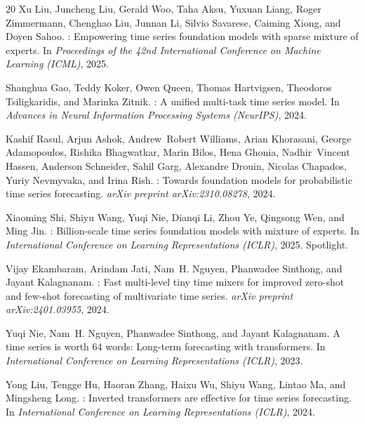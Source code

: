 \documentclass{article}
\begin{document}
\begin{thebibliography}{20}
Xu Liu, Juncheng Liu, Gerald Woo, Taha Aksu, Yuxuan Liang, Roger Zimmermann, Chenghao Liu, Junnan Li, Silvio Savarese, Caiming Xiong, and Doyen Sahoo.
: Empowering time series foundation models with sparse mixture of experts.
\newblock In \textit{Proceedings of the 42nd International Conference on Machine Learning (ICML)}, 2025.

Shanghua Gao, Teddy Koker, Owen Queen, Thomas Hartvigsen, Theodoros Tsiligkaridis, and Marinka Zitnik.
: A unified multi-task time series model.
\newblock In \textit{Advances in Neural Information Processing Systems (NeurIPS)}, 2024.

Kashif Rasul, Arjun Ashok, Andrew~Robert Williams, Arian Khorasani, George Adamopoulos, Rishika Bhagwatkar, Marin Bilos, Hena Ghonia, Nadhir~Vincent Hassen, Anderson Schneider, Sahil Garg, Alexandre Drouin, Nicolas Chapados, Yuriy Nevmyvaka, and Irina Rish.
: Towards foundation models for probabilistic time series forecasting.
\newblock \textit{arXiv preprint arXiv:2310.08278}, 2024.

Xiaoming Shi, Shiyu Wang, Yuqi Nie, Dianqi Li, Zhou Ye, Qingsong Wen, and Ming Jin.
: Billion-scale time series foundation models with mixture of experts.
\newblock In \textit{International Conference on Learning Representations (ICLR)}, 2025.
\newblock Spotlight.

Vijay Ekambaram, Arindam Jati, Nam~H. Nguyen, Phanwadee Sinthong, and Jayant Kalagnanam.
: Fast multi-level tiny time mixers for improved zero-shot and few-shot forecasting of multivariate time series.
\newblock \textit{arXiv preprint arXiv:2401.03955}, 2024.

Yuqi Nie, Nam~H. Nguyen, Phanwadee Sinthong, and Jayant Kalagnanam.
\newblock A time series is worth 64 words: Long-term forecasting with transformers.
\newblock In \textit{International Conference on Learning Representations (ICLR)}, 2023.

Yong Liu, Tengge Hu, Haoran Zhang, Haixu Wu, Shiyu Wang, Lintao Ma, and Mingsheng Long.
: Inverted transformers are effective for time series forecasting.
\newblock In \textit{International Conference on Learning Representations (ICLR)}, 2024.


\end{thebibliography}
\end{document}
